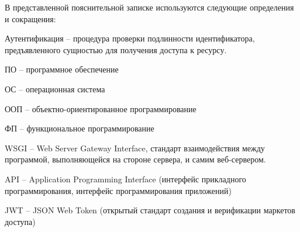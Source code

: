
В представленной пояснительной записке используются следующие определения и сокращения:

Аутентификация -- процедура проверки подлинности идентификатора, предъявленного сущностью для получения доступа к ресурсу.

ПО -- программное обеспечение

ОС -- операционная система

ООП -- объектно-ориентированное программирование

ФП -- функциональное программирование

WSGI -- Web Server Gateway Interface, стандарт взаимодействия между программой, выполняющейся на стороне сервера, и самим веб-сервером.

API -- Application Programming Interface (интерфейс прикладного программирования, интерфейс программирования приложений)

JWT -- JSON Web Token (открытый стандарт создания и верификации маркетов доступа)

\clearpage
